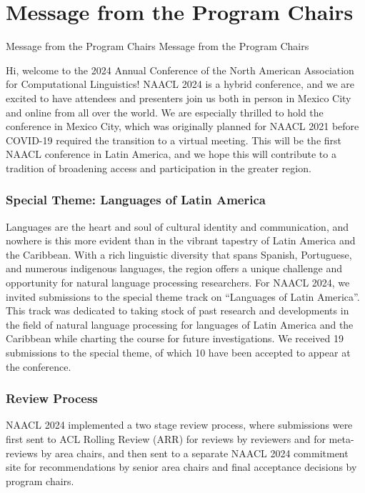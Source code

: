 \section{Message from the Program Chairs}
\setheaders%
    {Message from the Program Chairs}%
    {Message from the Program Chairs}
\thispagestyle{emptyheader}
\setlength{\parskip}{1ex}
\setlength{\parindent}{0pt}

Hi, welcome to the 2024 Annual Conference of the North American Association for Computational Linguistics! NAACL 2024 is a hybrid conference, and we are excited to have attendees and presenters join us both in person in Mexico City and online from all over the world. We are especially thrilled to hold the conference in Mexico City, which was originally planned for NAACL 2021 before COVID-19 required the transition to a virtual meeting. This will be the first NAACL conference in Latin America, and we hope this will contribute to a tradition of broadening access and participation in the greater region. 

\subsubsection*{Special Theme: Languages of Latin America}
Languages are the heart and soul of cultural identity and communication, and nowhere is this more evident than in the vibrant tapestry of Latin America and the Caribbean. With a rich linguistic diversity that spans Spanish, Portuguese, and numerous indigenous languages, the region offers a unique challenge and opportunity for natural language processing researchers. For NAACL 2024, we invited submissions to the special theme track on ``Languages of Latin America''. This track was dedicated to taking stock of past research and developments in the field of natural language processing for languages of Latin America and the Caribbean while charting the course for future investigations. We received 19 submissions to the special theme, of which 10 have been accepted to appear at the conference.

\subsubsection*{Review Process}
NAACL 2024 implemented a two stage review process, where submissions were first sent to ACL Rolling Review (ARR) for reviews by reviewers and for meta-reviews by area chairs, and then sent to a separate NAACL 2024 commitment site for recommendations by senior area chairs and final acceptance decisions by program chairs.

